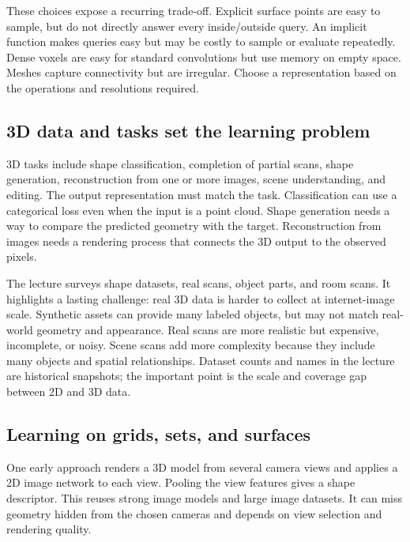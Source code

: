 These choices expose a recurring trade-off. Explicit surface points are easy to sample, but do not directly answer every inside/outside query. An implicit function makes queries easy but may be costly to sample or evaluate repeatedly. Dense voxels are easy for standard convolutions but use memory on empty space. Meshes capture connectivity but are irregular. Choose a representation based on the operations and resolutions required.

\subsection{3D data and tasks set the learning problem}\label{04-visual-computing-ii-ch034-d-data-and-tasks-set-the-learning-problem}

3D tasks include shape classification, completion of partial scans, shape generation, reconstruction from one or more images, scene understanding, and editing. The output representation must match the task. Classification can use a categorical loss even when the input is a point cloud. Shape generation needs a way to compare the predicted geometry with the target. Reconstruction from images needs a rendering process that connects the 3D output to the observed pixels.

The lecture surveys shape datasets, real scans, object parts, and room scans. It highlights a lasting challenge: real 3D data is harder to collect at internet-image scale. Synthetic assets can provide many labeled objects, but may not match real-world geometry and appearance. Real scans are more realistic but expensive, incomplete, or noisy. Scene scans add more complexity because they include many objects and spatial relationships. Dataset counts and names in the lecture are historical snapshots; the important point is the scale and coverage gap between 2D and 3D data.

\subsection{Learning on grids, sets, and surfaces}\label{04-visual-computing-ii-ch034-learning-on-grids-sets-and-surfaces}

One early approach renders a 3D model from several camera views and applies a 2D image network to each view. Pooling the view features gives a shape descriptor. This reuses strong image models and large image datasets. It can miss geometry hidden from the chosen cameras and depends on view selection and rendering quality.

